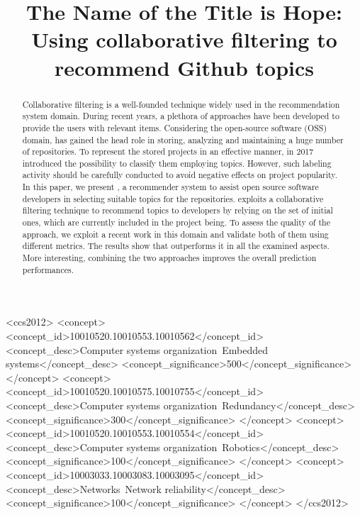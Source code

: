 \documentclass[sigconf]{acmart}
\begin{document}
\title{The Name of the Title is Hope}

\title{\CT: Using collaborative filtering to recommend Github topics}








\begin{abstract}
Collaborative filtering is a well-founded technique widely used in the recommendation system domain. During recent years, a plethora of approaches have been developed to provide the users with relevant items. Considering the open-source software (OSS) domain, \GH has gained the head role in storing, analyzing and maintaining a huge number of repositories. To represent the stored projects in an effective manner, in 2017 \GH introduced the possibility to classify them employing topics. However, such labeling activity should be carefully conducted to avoid negative effects on project popularity.
In this paper, we present \CT, a recommender system to assist open source software developers in selecting suitable topics for the repositories. \CT exploits a collaborative filtering technique to recommend topics to developers by relying on the set of initial ones, which are currently included in the project being. 
To assess the quality of the approach, we exploit a recent work in this domain and validate both of them using different metrics. The results show that \CT outperforms it in all the examined aspects. More interesting, combining the two approaches improves the overall prediction performances.

\end{abstract}

\begin{CCSXML}
<ccs2012>
 <concept>
  <concept_id>10010520.10010553.10010562</concept_id>
  <concept_desc>Computer systems organization~Embedded systems</concept_desc>
  <concept_significance>500</concept_significance>
 </concept>
 <concept>
  <concept_id>10010520.10010575.10010755</concept_id>
  <concept_desc>Computer systems organization~Redundancy</concept_desc>
  <concept_significance>300</concept_significance>
 </concept>
 <concept>
  <concept_id>10010520.10010553.10010554</concept_id>
  <concept_desc>Computer systems organization~Robotics</concept_desc>
  <concept_significance>100</concept_significance>
 </concept>
 <concept>
  <concept_id>10003033.10003083.10003095</concept_id>
  <concept_desc>Networks~Network reliability</concept_desc>
  <concept_significance>100</concept_significance>
 </concept>
</ccs2012>
\end{CCSXML}
\end{document}
